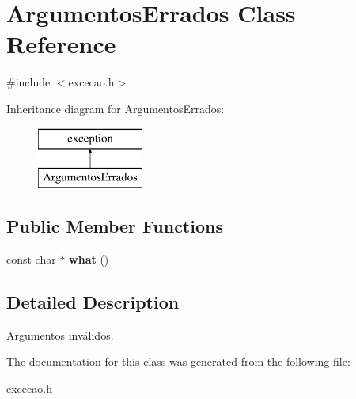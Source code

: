 \hypertarget{classArgumentosErrados}{}\section{Argumentos\+Errados Class Reference}
\label{classArgumentosErrados}


{\ttfamily \#include $<$excecao.\+h$>$}

Inheritance diagram for Argumentos\+Errados\+:\begin{figure}[H]
\begin{center}
\leavevmode
\includegraphics[height=2.000000cm]{classArgumentosErrados}
\end{center}
\end{figure}
\subsection*{Public Member Functions}
\begin{DoxyCompactItemize}
\item 
\mbox{\label{classArgumentosErrados_a9d23e10092cd69f8e9fdc94074a24ecf}} 
const char $\ast$ {\bfseries what} ()
\end{DoxyCompactItemize}


\subsection{Detailed Description}
Argumentos inválidos. 

The documentation for this class was generated from the following file\+:\begin{DoxyCompactItemize}
\item 
excecao.\+h\end{DoxyCompactItemize}
